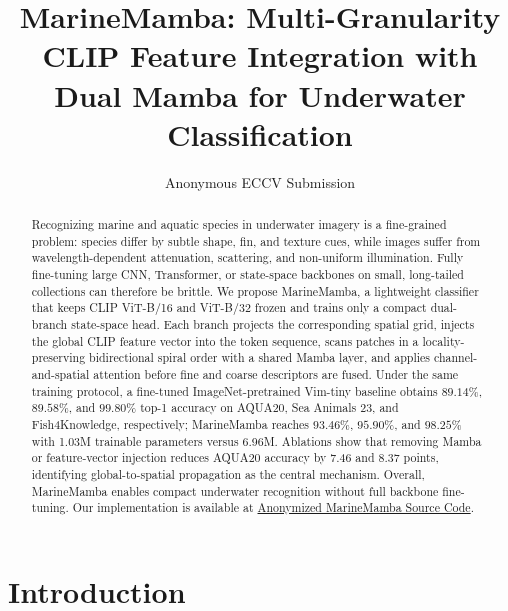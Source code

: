 \documentclass[runningheads]{llncs}
\begin{document}
\title{MarineMamba: Multi-Granularity CLIP Feature Integration with Dual Mamba for Underwater Classification}

\author{Anonymous ECCV Submission}

\maketitle

\begin{abstract}
Recognizing marine and aquatic species in underwater imagery is a fine-grained problem: species differ by subtle shape, fin, and texture cues, while images suffer from wavelength-dependent attenuation, scattering, and non-uniform illumination. Fully fine-tuning large CNN, Transformer, or state-space backbones on small, long-tailed collections can therefore be brittle. We propose MarineMamba, a lightweight classifier that keeps CLIP ViT-B/16 and ViT-B/32 frozen and trains only a compact dual-branch state-space head. Each branch projects the corresponding spatial grid, injects the global CLIP feature vector into the token sequence, scans patches in a locality-preserving bidirectional spiral order with a shared Mamba layer, and applies channel-and-spatial attention before fine and coarse descriptors are fused. Under the same training protocol, a fine-tuned ImageNet-pretrained Vim-tiny baseline obtains $89.14\%$, $89.58\%$, and $99.80\%$ top-1 accuracy on AQUA20, Sea Animals 23, and Fish4Knowledge, respectively; MarineMamba reaches $93.46\%$, $95.90\%$, and $98.25\%$ with 1.03M trainable parameters versus 6.96M. Ablations show that removing Mamba or feature-vector injection reduces AQUA20 accuracy by 7.46 and 8.37 points, identifying global-to-spatial propagation as the central mechanism. Overall, MarineMamba enables compact underwater recognition without full backbone fine-tuning. Our implementation is available at \href{https://anonymous.4open.science/r/MarineMamba/}{Anonymized MarineMamba Source Code}.
\end{abstract}

\section{Introduction}
\label{sec:intro}
\end{document}
